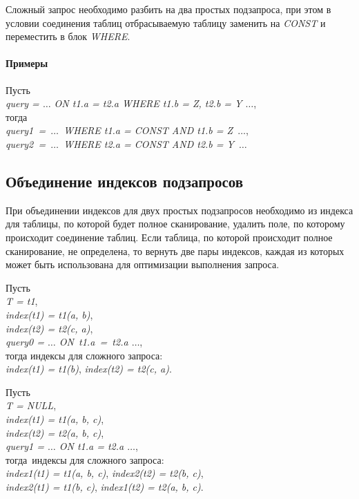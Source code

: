 Сложный запрос необходимо разбить на два простых подзапроса, при этом в условии соединения таблиц отбрасываемую таблицу заменить на \textit{CONST} и переместить в блок \textit{WHERE}.

\paragraph{Примеры}

Пусть \\
\textit{query = $\ldots$ ON t1.a = t2.a WHERE t1.b = Z, t2.b = Y $\ldots$},\\
тогда\\
\textit{query1 = $\ldots$ WHERE t1.a = CONST AND t1.b = Z $\ldots$}, \\
\textit{query2 = $\ldots$ WHERE t2.a = CONST AND t2.b = Y $\ldots$}





\subsection{Объединение индексов подзапросов}

При объединении индексов для двух простых подзапросов необходимо из индекса для таблицы, по которой будет полное сканирование, удалить поле, по которому происходит соединение таблиц. Если таблица, по которой происходит полное сканирование, не определена, то вернуть две пары индексов, каждая из которых может быть использована для оптимизации выполнения запроса.

Пусть \\
\textit{T = t1},\\
\textit{index(t1) = t1(a, b)},\\
\textit{index(t2) = t2(c, a)},\\
\textit{query0 = $\ldots$ ON t1.a = t2.a $\ldots$},\\
тогда индексы для сложного запроса: \\
\textit{index(t1) = t1(b)}, \textit{index(t2) = t2(c, a)}.

Пусть \\
\textit{T = NULL},\\
\textit{index(t1) = t1(a, b, c)},\\
\textit{index(t2) = t2(a, b, c)},\\
\textit{query1 = $\ldots$ ON t1.a = t2.a $\ldots$},\\
тогда индексы для сложного запроса: \\
\textit{index1(t1) = t1(a, b, c)}, \textit{index2(t2) = t2(b, c)},\\ 
\textit{index2(t1) = t1(b, c)}, \textit{index1(t2) = t2(a, b, c)}.


